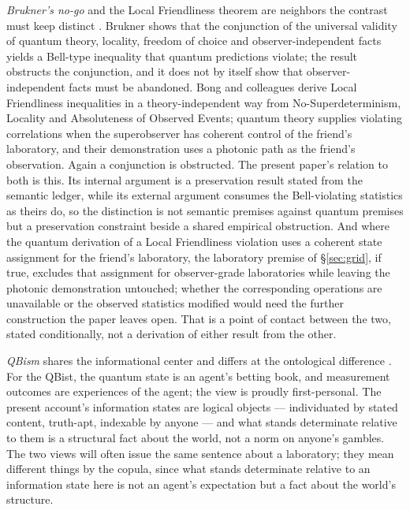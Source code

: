 \emph{Brukner's no-go} and the Local Friendliness theorem are neighbors the contrast must keep distinct \cite{brukner2018nogo, bong2020strong}. Brukner shows that the conjunction of the universal validity of quantum theory, locality, freedom of choice and observer-independent facts yields a Bell-type inequality that quantum predictions violate; the result obstructs the conjunction, and it does not by itself show that observer-independent facts must be abandoned. Bong and colleagues derive Local Friendliness inequalities in a theory-independent way from No-Superdeterminism, Locality and Absoluteness of Observed Events; quantum theory supplies violating correlations when the superobserver has coherent control of the friend's laboratory, and their demonstration uses a photonic path as the friend's observation. Again a conjunction is obstructed. The present paper's relation to both is this. Its internal argument is a preservation result stated from the semantic ledger, while its external argument consumes the Bell-violating statistics as theirs do, so the distinction is not semantic premises against quantum premises but a preservation constraint beside a shared empirical obstruction. And where the quantum derivation of a Local Friendliness violation uses a coherent state assignment for the friend's laboratory, the laboratory premise of \S\ref{sec:grid}, if true, excludes that assignment for observer-grade laboratories while leaving the photonic demonstration untouched; whether the corresponding operations are unavailable or the observed statistics modified would need the further construction the paper leaves open. That is a point of contact between the two, stated conditionally, not a derivation of either result from the other.

\emph{QBism} shares the informational center and differs at the ontological difference \cite{fuchs2014introduction}. For the QBist, the quantum state is an agent's betting book, and measurement outcomes are experiences of the agent; the view is proudly first-personal. The present account's information states are logical objects --- individuated by stated content, truth-apt, indexable by anyone --- and what stands determinate relative to them is a structural fact about the world, not a norm on anyone's gambles. The two views will often issue the same sentence about a laboratory; they mean different things by the copula, since what stands determinate relative to an information state here is not an agent's expectation but a fact about the world's structure.

